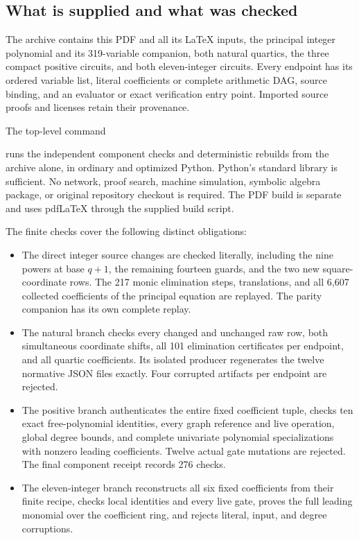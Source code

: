 \subsection{What is supplied and what was checked}

The archive contains this PDF and all its LaTeX inputs, the principal
integer polynomial and its 319-variable companion, both natural quartics,
the three compact positive circuits, and both eleven-integer circuits.
Every endpoint has its ordered variable list, literal coefficients or
complete arithmetic DAG, source binding, and an evaluator or exact
verification entry point. Imported source proofs and licenses retain
their provenance.

The top-level command
\begin{center}\end{center}
runs the independent component checks and deterministic rebuilds from the
archive alone, in ordinary and optimized Python. Python's standard library
is sufficient. No network, proof search, machine simulation, symbolic
algebra package, or original repository checkout is required. The PDF
build is separate and uses pdfLaTeX through the supplied build script.

The finite checks cover the following distinct obligations:
\begin{itemize}
\item The direct integer source changes are checked literally, including
the nine powers at base $q+1$, the remaining fourteen guards, and the two
new square-coordinate rows. The 217 monic elimination steps, translations,
and all 6,607 collected coefficients of the principal equation are replayed.
The parity companion has its own complete replay.
\item The natural branch checks every changed and unchanged raw row,
both simultaneous coordinate shifts, all 101 elimination certificates per
endpoint, and all quartic coefficients. Its isolated producer regenerates
the twelve normative JSON files exactly. Four corrupted artifacts per
endpoint are rejected.
\item The positive branch authenticates the entire fixed coefficient tuple,
checks ten exact free-polynomial identities, every graph reference and live
operation, global degree bounds, and complete univariate polynomial
specializations with nonzero leading coefficients. Twelve actual gate
mutations are rejected. The final component receipt records 276 checks.
\item The eleven-integer branch reconstructs all six fixed coefficients
from their finite recipe, checks local identities and every live gate,
proves the full leading monomial over the coefficient ring, and rejects
literal, input, and degree corruptions.
\end{itemize}

